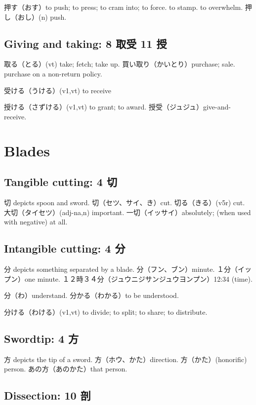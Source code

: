 押す（おす）to push; to press; to cram into; to force.
to stamp.
to overwhelm.
押し（おし）(n) push.

\subsection{Giving and taking: 8 取受 11 授}

取る（とる）(vt) take; fetch; take up.
買い取り（かいとり）purchase; sale. purchase on a non-return policy.

受ける（うける）(v1,vt) to receive

授ける（さずける）(v1,vt) to grant; to award.
授受（ジュジュ）give-and-receive.

\section{Blades}

\subsection{Tangible cutting: 4 切}

切 depicts spoon and sword.
切（セツ、サイ、き）cut.
切る（きる）(v5r) cut.
大切（タイセツ）(adj-na,n) important.
一切（イッサイ）absolutely; (when used with negative) at all.

\subsection{Intangible cutting: 4 分}

分 depicts something separated by a blade.
分（フン、ブン）minute.
１分（イップン）one minute.
１２時３４分（ジュウニジサンジュウヨンプン）12:34 (time).

分（わ）understand.
分かる（わかる）to be understood.

分ける（わける）(v1,vt) to divide; to split; to share; to distribute.

\subsection{Swordtip: 4 方}

方 depicts the tip of a sword.
方（ホウ、かた）direction.
方（かた）(honorific) person.
あの方（あのかた）that person.

\subsection{Dissection: 10 剖}

